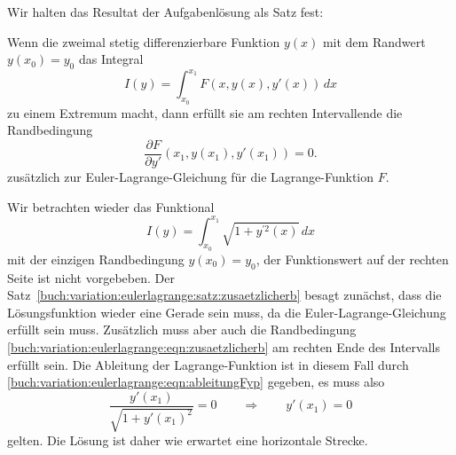Wir halten das Resultat der Aufgabenlösung als Satz fest:

\begin{satz}
\label{buch:variation:eulerlagrange:satz:zusaetzlicherb}
Wenn die zweimal stetig differenzierbare Funktion $y(x)$ mit dem
Randwert $y(x_0)=y_0$ das Integral
\[
I(y)
=
\int_{x_0}^{x_1} F(x,y(x),y'(x))\,dx
\]
zu einem Extremum macht, dann erfüllt sie am rechten Intervallende
die Randbedingung
\begin{equation}
\frac{\partial F}{\partial y'}(x_1,y(x_1),y'(x_1))=0.
\label{buch:variation:eulerlagrange:eqn:zusaetzlicherb}
\end{equation}
zusätzlich zur Euler-Lagrange-Gleichung für die Lagrange-Funktion $F$.
\end{satz}

\begin{beispiel}
\label{buch:variation:eulerlagrange:beispiel:einseitigegerade}
Wir betrachten wieder das Funktional
\[
I(y)
=
\int_{x_0}^{x_1}
\sqrt{1+y^{\prime 2}(x)}
\,dx
\]
mit der einzigen Randbedingung $y(x_0)=y_0$, der Funktionswert auf 
der rechten Seite ist nicht vorgebeben.
Der Satz~\eqref{buch:variation:eulerlagrange:satz:zusaetzlicherb}
besagt zunächst, dass die Lösungsfunktion wieder eine Gerade sein
muss, da die Euler-Lagrange-Gleichung erfüllt sein muss.
Zusätzlich muss aber auch die Randbedingung
\eqref{buch:variation:eulerlagrange:eqn:zusaetzlicherb}
am rechten Ende des Intervalls erfüllt sein.
Die Ableitung der Lagrange-Funktion ist in diesem Fall durch
\eqref{buch:variation:eulerlagrange:eqn:ableitungFyp}
gegeben, es muss also
\[
\frac{y'(x_1)}{\sqrt{1+y'(x_1)^2}}
=
0
\qquad\Rightarrow\qquad y'(x_1)=0
\]
gelten.
Die Lösung ist daher wie erwartet eine horizontale Strecke.
\end{beispiel}


